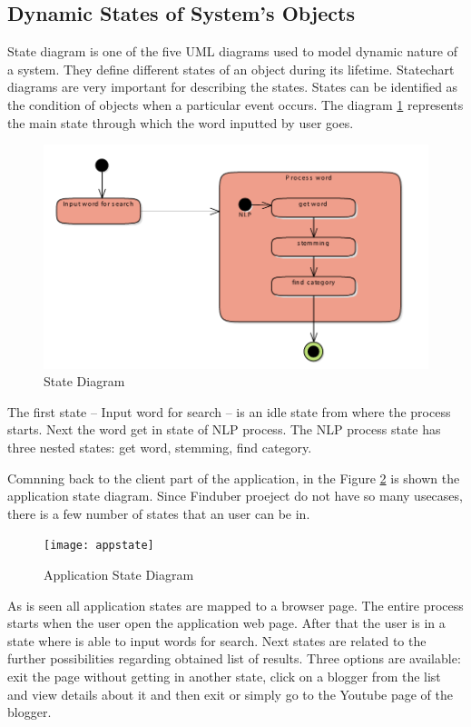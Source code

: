 \subsection{Dynamic States of System's Objects}

State diagram is one of the five UML diagrams used to model dynamic nature of a system. They define different states of an object during its lifetime. Statechart diagrams are very important for describing the states. States can be identified as the condition of objects when a particular event occurs. The diagram \ref{state_uml} represents the main state through which the word inputted by user goes. 

\begin{figure}[!ht]
\centering
\includegraphics[width=15cm]{wordstate}
\caption{State Diagram}\label{state_uml}
\end{figure}

The first state -- Input word for search -- is an idle state from where the process starts. Next the word get in state of NLP process. The NLP process state has three nested states: get word, stemming, find category. 

Comnning back to the client part of the application, in the Figure \ref{appstates} is shown the application state diagram. Since Finduber proeject do not have so many usecases, there is a few number of states that an user can be in.

\begin{figure}[!ht]
\centering
\texttt{[image: appstate]}
\caption{Application State Diagram}\label{appstates}
\end{figure}

As is seen all application states are mapped to a browser page. The entire process starts when the user open the application web page. After that the user is in a state where is able to input words for search. Next states are related to the further possibilities regarding obtained list of results. Three options are available: exit the page without getting in another state, click on a blogger from the list and view details about it and then exit or simply go to the Youtube page of the blogger.

